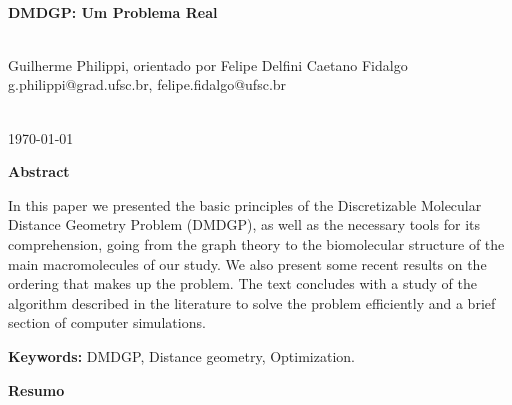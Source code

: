 \documentclass[a4paper,12pt]{article}
\begin{document}
\begin{titlepage}
		
		\HRule \\[0.4cm]
		{ \LARGE \bfseries DMDGP: Um Problema Real} \\ [0.4cm] %
		\HRule \\[2.5cm]
		
		
		\begin{minipage}{1\textwidth}
			\begin{center} \large
				Guilherme Philippi, orientado por Felipe Delfini Caetano Fidalgo
				\\g.philippi@grad.ufsc.br, felipe.fidalgo@ufsc.br 
			\end{center}
		\end{minipage} \\[2cm]
		
		
		{\large \today} %
		
		
		\vfill %
		
	\end{titlepage}
	
	
	\newpage
	\tableofcontents
	\newpage
	
	\begin{center}
		\large
		\textbf{Abstract}
	\end{center}
	
	
	In this paper we presented the basic principles of the Discretizable Molecular Distance Geometry Problem (DMDGP), as well as the necessary tools for its comprehension, going from the graph theory to the biomolecular structure of the main macromolecules of our study. We also present some recent results on the ordering that makes up the problem. The text concludes with a study of the algorithm described in the literature to solve the problem efficiently and a brief section of computer simulations.
	
	\textbf{Keywords:} DMDGP, Distance geometry, Optimization.
	 
	
	\vspace{2cm}	
	\begin{center}
		\large
		\textbf{Resumo}
	\end{center}
	
\end{document}
